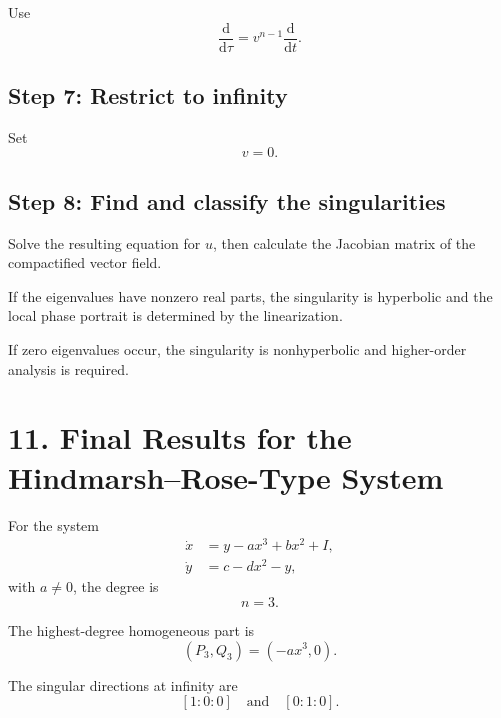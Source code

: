 \documentclass[11pt,a4paper]{article}
\newcommand{\dd}{\mathrm{d}}
\begin{document}
Use
\begin{equation}
\boxed{
\frac{\dd}{\dd\tau}
=
v^{n-1}\frac{\dd}{\dd t}.
}
\end{equation}

\subsection*{Step 7: Restrict to infinity}

Set
\begin{equation}
v=0.
\end{equation}

\subsection*{Step 8: Find and classify the singularities}

Solve the resulting equation for $u$, then calculate the Jacobian
matrix of the compactified vector field.

If the eigenvalues have nonzero real parts, the singularity is
hyperbolic and the local phase portrait is determined by the
linearization.

If zero eigenvalues occur, the singularity is nonhyperbolic and
higher-order analysis is required.

\section{11. Final Results for the Hindmarsh--Rose-Type System}

For the system
\begin{equation}
\boxed{
\begin{aligned}
\dot{x}&=y-a x^3+b x^2+I,\\
\dot{y}&=c-dx^2-y,
\end{aligned}}
\end{equation}
with $a\neq0$, the degree is
\begin{equation}
\boxed{n=3}.
\end{equation}

The highest-degree homogeneous part is
\begin{equation}
\boxed{
(P_3,Q_3)=(-ax^3,0).
}
\end{equation}

The singular directions at infinity are
\begin{equation}
\boxed{
[1:0:0]
\quad\text{and}\quad
[0:1:0].
}
\end{equation}
\end{document}
